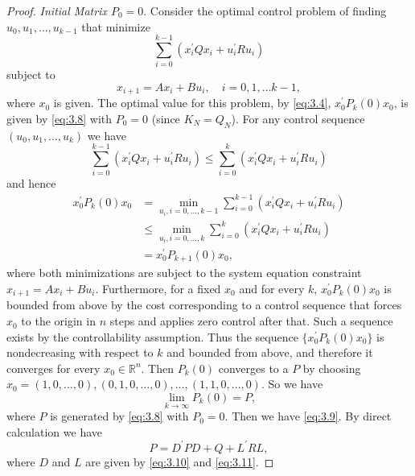 \begin{proof}
\textit{Initial Matrix $P_0=0$}. 
    Consider the optimal control problem of finding $u_0,u_1,\dots,u_{k-1}$ that minimize
    \[\sum_{i=0}^{k-1} (x_i^\prime Q x_i + u_i^\prime R u_i)\]
    subject to \[x_{i + 1} = Ax_i + Bu_i,\quad i = 0,1,\dots k - 1,\]
    where $x_0$ is given. The optimal value for this problem, by \cref{eq:3.4}, $x_0^\prime P_k(0) x_0$, is given by \cref{eq:3.8} with $P_0=0 $ (since $K_N=Q_N$). 
    For any control sequence ${(u_0,u_1,\dots,u_{k})} $ we have 
    \[\sum_{i=0}^{k-1} (x_i^\prime Q x_i + u_i^\prime R u_i)\leq \sum_{i=0}^{k} (x_i^\prime Q x_i + u_i^\prime R u_i)\]
    and hence 
    \[\begin{aligned}
        x_0^\prime P_k(0) x_0 &=\min_{u_i,i = 0,\dots,k - 1}\sum_{i=0}^{k-1} (x_i^{\prime} Q x_i + u_i^{\prime} R u_i)\\
            &\leq \min_{u_i,i = 0,\dots,k}\sum_{i=0}^{k}
            (x_i^{\prime} Q x_i + u_i^{\prime} R u_i)\\
            &= x_0^\prime P_{k + 1}(0)x_0,
    \end{aligned}\]
    where both minimizations are subject to the system equation constraint $x_{i+1}=A x_i+B u_i$. Furthermore, for a fixed $x_0$ and for every $k$, $x_0^{\prime} P_k(0) x_0$ is bounded from above by the cost corresponding to a control sequence that forces $x_0$ to the origin in $n$ steps and applies zero control after that. Such a sequence exists by the controllability assumption. Thus the sequence $\{x_0^{\prime} P_k(0) x_0\}$ is nondecreasing with respect to $k$ and bounded from above, and therefore it converges for every $x_0\in\mathbb{R}^n$. Then $P_k(0)$ converges to a $P$ by choosing $x_0=(1,0,\dots,0), (0,1,0,\dots,0),\dots,(1,1,0,\dots,0)$. So we have \[\lim_{k\rightarrow\infty}P_k(0) = P,\]
    where $P$ is generated by \cref{eq:3.8} with $P_0=0$. Then we have \cref{eq:3.9}. 
    By direct calculation we have 
    \begin{equation}\label{eq:3.13}
        P = D^\prime P D + Q + L^\prime R L,
    \end{equation}
    where $D$ and $L$ are given by \cref{eq:3.10} and \cref{eq:3.11}. 


\end{proof}
